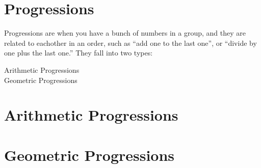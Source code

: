 \section{Progressions}
\label{chap:Progressions}
Progressions are when you have a bunch of numbers in a group, and they are
related to eachother in an order, such as ``add one to the last one'', or
``divide by one plus the last one.'' They fall into two types:
\begin{description}
  \item[Arithmetic Progressions]
  \item[Geometric Progressions]
\end{description}

\section{Arithmetic Progressions}
\label{ArithmeticProgressions}

\section{Geometric Progressions}
\label{GeometricProgressions}